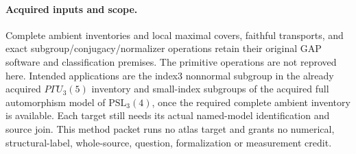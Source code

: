 \documentclass[11pt]{article}
\begin{document}
\paragraph{Acquired inputs and scope.}
Complete ambient inventories and local maximal covers, faithful transports,
and exact subgroup/conjugacy/normalizer operations retain their original
GAP software and classification premises. The primitive operations are not
reproved here. Intended applications are the index3 nonnormal subgroup in
the already acquired $P\Gamma U_3(5)$ inventory and small-index subgroups
of the acquired full automorphism model of $\mathrm{PSL}_3(4)$, once the
required complete ambient inventory is available. Each target still needs
its actual named-model identification and source join. This method packet
runs no atlas target and grants no numerical, structural-label, whole-source,
question, formalization or measurement credit.
\end{document}
